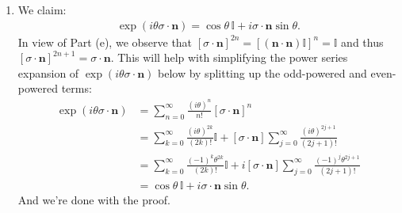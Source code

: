 \documentclass{article}
\theoremstyle{definition}
\newcommand{\f}[2]{\frac{#1}{#2}}
\newcommand{\lp}{\left(}
\newcommand{\rp}{\right)}
\newcommand{\lb}{\left[}
\newcommand{\rb}{\right]}
\begin{document}
\begin{enumerate}[label = (\alph*)]
	\item We claim: 
	\begin{align*}
	\exp\lp i\theta \sigma \cdot \mathbf{n} \rp = \cos\theta \, \mathbb{I} + i\sigma \cdot \mathbf{n}\sin\theta.
	\end{align*}
	In view of Part (e), we observe that $[\sigma \cdot \mathbf{n}]^{2n} = [(\mathbf{n}\cdot \mathbf{n}) \mathbb{I}]^n = \mathbb{I}$ and thus $[\sigma \cdot \mathbf{n}]^{2n+1} = \sigma \cdot \mathbf{n}$. This will help with simplifying the power series expansion of $\exp(i\theta\sigma \cdot \mathbf{n})$ below by splitting up the odd-powered and even-powered terms:
	\begin{align*}
	\exp\lp i\theta \sigma \cdot \mathbf{n} \rp
	&= \sum_{n=0}^\infty \f{(i\theta)^n}{n!} \lb  \sigma \cdot \mathbf{n} \rb^n \\
	&= \sum_{k=0}^\infty \f{(i\theta)^{2k}}{(2k)!} \mathbb{I} +  [\sigma \cdot \mathbf{n}] \sum_{j=0}^{\infty} \f{(i\theta)^{2j+1}}{(2j+1)!}\\
	&= \sum_{k=0}^\infty \f{(-1)^k\theta^{2k}}{(2k)!} \mathbb{I} +  i[\sigma \cdot \mathbf{n}] \sum_{j=0}^{\infty} \f{(-1)^{j}\theta^{2j+1}}{(2j+1)!}\\
	&= \cos\theta\, \mathbb{I} +   i\sigma \cdot \mathbf{n}\sin\theta.
	\end{align*}
	And we're done with the proof. 
	
\end{enumerate}
\end{document}
